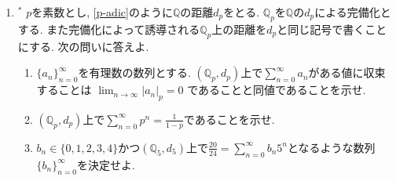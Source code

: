 \documentclass[dvipdfmx,a4paper,11pt]{article}
\newcommand{\Q}{\mathbb{Q}}
\theoremstyle{definition}
\begin{document}
\begin{enumerate}[label=\textbf{問}\ref*{sec-completion}.\arabic*]




 \item \label{Qp}$^{*}$ $p$を素数とし, \ref{p-adic}のように$\Q$の距離$d_{p}$をとる. 
$\Q_p$を$\Q$の$d_{p}$による完備化とする. また完備化によって誘導される$\Q_p$上の距離を$d_{p}$と同じ記号で書くことにする.
次の問いに答えよ.
	\begin{enumerate}
		\setlength{\parskip}{0cm} 
  \setlength{\itemsep}{0pt} 
\item $\{ a_{n}\}_{n=0}^{\infty}$を有理数の数列とする. $(\Q_p,d_{p})$上で$\sum_{n=0}^{\infty} a_n$がある値に収束することは
$\lim_{n \rightarrow \infty}|a_n|_{p} = 0$ であることと同値であることを示せ.
\item $(\Q_p,d_{p})$上で$\sum_{n=0}^{\infty} p^n =\frac{1}{1-p}$であることを示せ. %
\item $b_n \in \{0,1,2,3,4\}$かつ$(\Q_5,d_{5})$上で$\frac{20}{24} = \sum_{n=0}^{\infty} b_n 5^n$となるような数列$\{b_n\}_{n=0}^{\infty}$を決定せよ.
\end{enumerate}


\end{enumerate}
\end{document}
